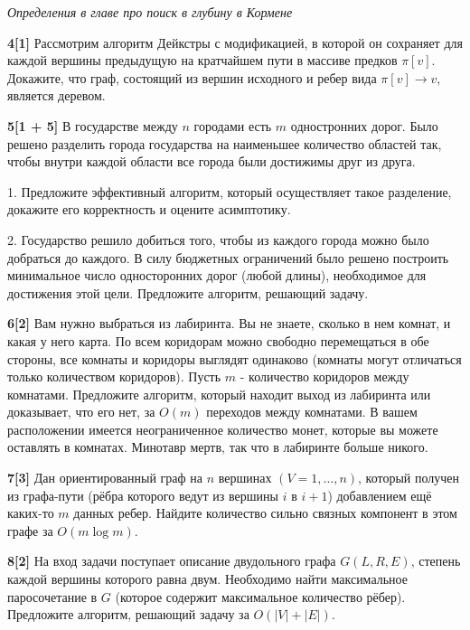 \documentclass{article}
\begin{document}
\textit{Определения в главе про поиск в глубину в Кормене}

\medskip

\textbf{4[1]} Рассмотрим алгоритм Дейкстры с модификацией, в которой он сохраняет для каждой вершины предыдущую на кратчайшем пути в массиве предков $\pi[v]$. Докажите, что граф, состоящий из вершин исходного и ребер вида $\pi[v] \rightarrow v$, является деревом.

\medskip

\textbf{5[1 + 5]} В государстве между $n$ городами есть $m$ одностронних дорог. Было решено разделить города государства на наименьшее количество областей так, чтобы внутри каждой области
все города были достижимы друг из друга.

1. Предложите эффективный алгоритм, который осуществляет такое разделение, докажите его корректность и оцените асимптотику.

2. Государство решило добиться того, чтобы из каждого города можно было добраться до каждого. В силу бюджетных ограничений было решено построить минимальное число односторонних дорог (любой длины), необходимое для достижения этой цели. Предложите алгоритм, решающий задачу.

\medskip

\textbf{6[2]} Вам нужно выбраться из лабиринта. Вы не знаете, сколько в нем комнат, и какая у него карта. По всем коридорам можно свободно перемещаться в обе стороны, все комнаты и коридоры выглядят одинаково (комнаты могут отличаться только количеством коридоров).
Пусть $m$ - количество коридоров между комнатами. Предложите алгоритм, который находит выход из лабиринта или доказывает, что его нет, за $O(m)$ переходов между комнатами. В вашем расположении имеется неограниченное количество монет, которые вы можете оставлять
в комнатах. Минотавр мертв, так что в лабиринте больше никого.

\medskip

\textbf{7[3]} Дан ориентированный граф на $n$ вершинах $(V = {1, \dots,n})$, который получен из графа-пути (рёбра которого ведут из вершины $i$ в $i + 1$) добавлением ещё каких-то $m$ данных ребер. Найдите количество сильно связных компонент в этом графе за $O(m \log m)$.

\medskip

\textbf{8[2]} На вход задачи поступает описание двудольного графа $G(L, R, E)$, степень каждой вершины которого равна двум. Необходимо найти максимальное паросочетание в $G$ (которое содержит
максимальное количество рёбер). Предложите алгоритм, решающий задачу за $O(|V | + |E|)$.
\end{document}
